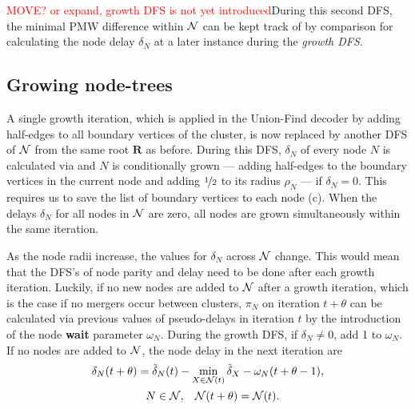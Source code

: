 \textcolor{red}{MOVE? or expand, growth DFS is not yet introduced}During this second DFS, the minimal PMW difference within $\mathcal{N}$ can be kept track of by comparison for calculating the node delay $\delta_N$ at a later instance during the \emph{growth DFS}. 

\subsection{Growing node-trees}\label{sec:grownodetrees}

A single growth iteration, which is applied in the Union-Find decoder by adding half-edges to all boundary vertices of the cluster, is now replaced by another DFS of $\mathcal{N}$ from the same root $\mathbf{R}$ as before. During this DFS, $\delta_N$ of every node $N$ is calculated via  and $N$ is conditionally grown --- adding half-edges to the boundary vertices in the current node and adding $\nicefrac{1}{2}$ to its radius $\rho_N$ --- if $\delta_N = 0$. This requires us to save the list of boundary vertices to each node (c). When the delays $\delta_N$ for all nodes in $\mathcal{N}$ are zero, all nodes are grown simultaneously within the same iteration. 

As the node radii increase, the values for $\delta_N$ across $\mathcal{N}$ change. This would mean that the DFS's of node parity and delay need to be done after each growth iteration. Luckily, if no new nodes are added to $\mathcal{N}$ after a growth iteration, which is the case if no mergers occur between clusters, $\pi_N$ on iteration $t+\theta$ can be calculated via previous values of pseudo-delays in iteration $t$ by the introduction of the node \textbf{wait} parameter $\omega_N$. During the growth DFS, if $\delta_N \neq 0$, add 1 to $\omega_N$. If no nodes are added to $\mathcal{N}$, the node delay in the next iteration are
\begin{multline}\label{eq:delay}
    \delta_N(t+\theta) = \tilde{\delta}_N(t) - \min_{X \in \mathcal{N}(t)}{\tilde{\delta}_X} - \omega_N(t+\theta-1),  \\
    \hspace{.3cm} N \in \mathcal{N}, \hspace{.3cm} \mathcal{N}(t+\theta) = \mathcal{N}(t).  
\end{multline}



